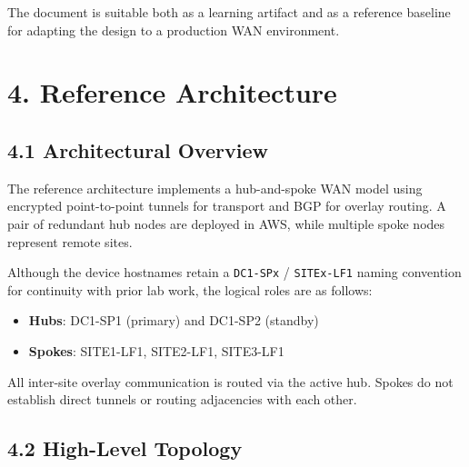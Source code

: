 \documentclass[11pt]{article}
\begin{document}
The document is suitable both as a learning artifact and as a reference baseline for adapting the design to a production WAN environment.

%
%
%
\section{4. Reference Architecture}
\label{sec:reference-architecture}

\subsection{4.1 Architectural Overview}
\label{sec:arch-overview}

The reference architecture implements a hub-and-spoke WAN model using encrypted point-to-point tunnels for transport and BGP for overlay routing. A pair of redundant hub nodes are deployed in AWS, while multiple spoke nodes represent remote sites.

Although the device hostnames retain a \texttt{DC1-SPx} / \texttt{SITEx-LF1} naming convention for continuity with prior lab work, the logical roles are as follows:

\begin{itemize}
  \item \textbf{Hubs}: DC1-SP1 (primary) and DC1-SP2 (standby)
  \item \textbf{Spokes}: SITE1-LF1, SITE2-LF1, SITE3-LF1
\end{itemize}

All inter-site overlay communication is routed via the active hub. Spokes do not establish direct tunnels or routing adjacencies with each other.

\subsection{4.2 High-Level Topology}
\label{sec:high-level-topology}
\end{document}
